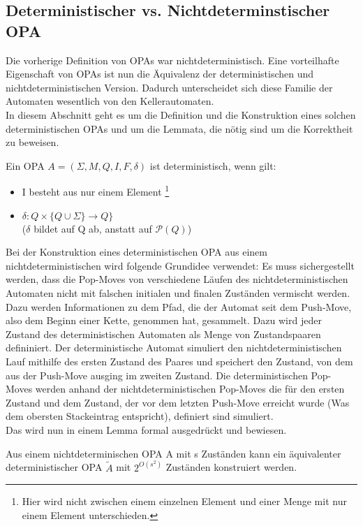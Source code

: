 \subsection{Deterministischer vs. Nichtdeterminstischer OPA}
Die vorherige Definition von OPAs war nichtdeterministisch. Eine vorteilhafte Eigenschaft von OPAs ist nun die Äquivalenz der deterministischen und nichtdeterministischen Version. Dadurch unterscheidet sich diese Familie der Automaten wesentlich von den Kellerautomaten. \\
In diesem Abschnitt geht es um die Definition und die Konstruktion eines solchen deterministischen OPAs und um die Lemmata, die nötig sind um die Korrektheit zu beweisen.
\begin{definition}
Ein OPA $A=(\Sigma, M, Q, I, F, \delta)$ ist deterministisch, wenn gilt:
\begin{itemize}
\item
I besteht aus nur einem Element \footnote{Hier wird nicht zwischen einem einzelnen Element und einer Menge mit nur einem Element unterschieden.}
\item
$\delta: Q \times \{Q \cup \Sigma\} \rightarrow Q\}$ \\
($\delta$ bildet auf Q ab, anstatt auf $\mathcal{P}(Q)$)
\end{itemize}
\end{definition}
Bei der Konstruktion eines deterministischen OPA aus einem nichtdeterministischen wird folgende Grundidee verwendet: Es muss sichergestellt werden, dass die Pop-Moves von verschiedene Läufen des nichtdeterministischen Automaten nicht mit falschen initialen und finalen Zuständen vermischt werden. Dazu werden Informationen zu dem Pfad, die der Automat seit dem Push-Move, also dem Beginn einer Kette, genommen hat, gesammelt. Dazu wird jeder Zustand des deterministischen Automaten als Menge von Zustandspaaren defininiert. Der deterministische Automat simuliert den nichtdeterministischen Lauf mithilfe des ersten Zustand des Paares und speichert den Zustand, von dem aus der Push-Move ausging im zweiten Zustand. Die deterministischen Pop-Moves werden anhand  der nichtdeterministischen Pop-Moves die für den ersten Zustand und dem Zustand, der vor dem letzten Push-Move erreicht wurde (Was dem obersten Stackeintrag entspricht), definiert sind simuliert.\\
Das wird nun in einem Lemma formal ausgedrückt und bewiesen.
\begin{lemma}
\label{lemma_Deter}
Aus einem nichtdeterminischen OPA A mit s Zuständen kann ein äquivalenter deterministischer OPA $\tilde{A}$ mit $2^{O(s^2)}$ Zuständen konstruiert werden.
\end{lemma}
